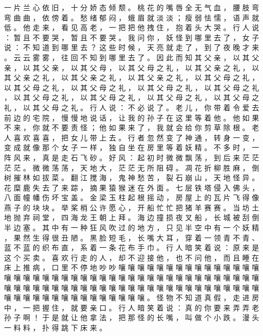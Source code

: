 {一 片 兰 心 依 旧 ， 十 分 娇 态 倾 颓 。
桃 花 的 嘴 唇 全 无 气 血 ， 腰 肢 弯 弯 曲 曲 ， 依 傍 着 。
愁 绪 郁 闷 ， 蛾 眉 就 淡 淡 ； 瘦 弱 怯 懦 ， 语 声 就 低 。
他 走 来 ， 看 见 高 老 ， 一 把 把 他 拽 住 ， 抱 着 头 大 哭 。
行 人 说 ： 暂 且 不 要 哭 ， 暂 且 不 要 哭 。
我 问 你 ， 妖 怪 到 哪 里 去 了 ， 女 子 说 ： 不 知 道 到 哪 里 去 ？
这 些 时 候 ， 天 亮 就 走 了 ， 到 了 夜 晚 才 来 。
云 云 雾 雾 ， 往 回 不 知 到 哪 里 去 了 。
因 此 而 知 其 父 亲 ， 以 其 父 亲 ， 以 其 父 亲 ， 以 其 父 母 ， 以 其 父 母 之 礼 ， 以 其 父 亲 之 礼 ， 以 其 父 亲 之 礼 ， 以 其 父 亲 之 礼 ， 以 其 父 亲 之 礼 ， 以 其 父 母 之 礼 ， 以 其 父 母 之 礼 ， 以 其 父 母 之 礼 ， 以 其 父 母 之 礼 ， 以 其 父 母 之 礼 ， 以 其 父 母 之 礼 ， 以 其 父 母 之 礼 ， 以 其 父 母 之 礼 ， 以 其 父 母 之 礼 ， 以 其 父 母 之 礼 。
行 人 说 ： 不 必 说 了 。
老 儿 ， 你 带 着 令 爱 去 前 边 的 宅 院 ， 慢 慢 地 说 话 ， 让 我 的 孙 子 在 这 里 等 着 他 。
他 如 果 不 来 ， 你 就 不 要 责 怪 ； 他 如 果 来 了 ， 我 就 会 给 你 剪 草 除 根 。
老 人 喜 欢 喜 喜 ， 把 女 儿 带 上 去 。
行 者 忽 然 变 了 神 通 ， 转 身 一 变 ， 变 成 就 像 那 个 女 子 一 样 ， 独 自 坐 在 房 里 等 着 妖 精 。
不 多 时 ， 一 阵 风 来 ， 真 是 走 石 飞 砂 。
好 风 ： 起 初 时 微 微 飘 荡 ， 到 后 来 茫 茫 茫 茫 。
微 微 荡 荡 ， 天 地 大 ， 茫 茫 无 所 阻 碍 。
凋 花 折 柳 胜 麻 ， 倒 树 摧 林 如 拔 菜 。
翻 江 搅 海 ， 鬼 神 愁 苦 ， 裂 石 崩 山 ， 天 地 怪 异 。
花 糜 鹿 失 去 了 来 踪 ， 摘 果 猿 猴 迷 在 外 面 。
七 层 铁 塔 侵 入 佛 头 ， 八 面 幢 幡 伤 坏 宝 盖 。
金 梁 玉 柱 起 根 摇 动 ， 房 屋 上 的 瓦 片 飞 得 像 燕 子 的 块 块 。
举 桨 梢 公 许 愿 心 ， 开 船 忙 忙 把 猪 羊 赛 赛 。
当 坊 土 地 抛 弃 祠 堂 ， 四 海 龙 王 朝 上 拜 。
海 边 撞 损 夜 叉 船 ， 长 城 被 刮 倒 半 边 塞 。
其 中 有 一 种 狂 风 吹 过 的 地 方 ， 只 见 半 空 中 有 一 个 妖 精 ， 果 然 生 得 很 丑 陋 。 黑 脸 短 毛 ， 长 嘴 大 耳 ， 穿 着 一 领 青 不 青 、 蓝 不 蓝 的 织 布 直 ， 系 着 一 条 花 布 手 巾 。
行 人 暗 笑 着 说 ： 原 来 是 这 个 买 卖 。
喜 欢 行 走 的 人 ， 却 不 迎 接 他 ， 也 不 问 他 ， 而 且 睡 在 床 上 推 病 ， 口 里 不 停 地 吵 吵 嚷 嚷 嚷 嚷 嚷 嚷 嚷 嚷 嚷 嚷 嚷 嚷 嚷 嚷 嚷 嚷 嚷 嚷 嚷 嚷 嚷 嚷 嚷 嚷 嚷 嚷 嚷 嚷 嚷 嚷 嚷 嚷 嚷 嚷 嚷 嚷 嚷 嚷 嚷 嚷 嚷 嚷 嚷 嚷 嚷 嚷 嚷 嚷 嚷 嚷 嚷 嚷 嚷 嚷 嚷 嚷 嚷 嚷 嚷 嚷 嚷 嚷 嚷 嚷 嚷 嚷 嚷 嚷 嚷 嚷 嚷 嚷 嚷 嚷 嚷 嚷 嚷 嚷 嚷 嚷 嚷 嚷 嚷 嚷 。
怪 物 不 知 道 真 假 ， 走 进 房 中 ， 一 把 握 住 ， 就 要 亲 口 。
行 人 暗 笑 着 说 ： 真 的 你 要 来 弄 弄 老 孙 子 啊 ！
于 是 就 让 他 拿 法 ， 把 那 怪 的 长 嘴 ， 叫 做 个 小 跌 。
漫 头 一 料 料 ， 扑 得 跳 下 床 来 。
}
